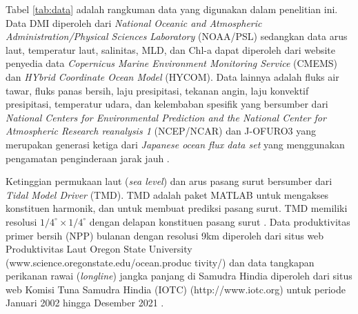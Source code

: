 \begin{spacing}{1.5}
	Tabel \ref*{tab:data} adalah rangkuman data yang digunakan dalam penelitian ini. Data DMI diperoleh dari \textit{National Oceanic and Atmospheric Administration/Physical Sciences Laboratory} (NOAA/PSL) \cite{Saji2003} sedangkan data arus laut, temperatur laut, salinitas, MLD, dan Chl-a dapat diperoleh dari website penyedia data \textit{Copernicus Marine Environment Monitoring Service} (CMEMS)\cite{Lellouche2018} dan \textit{HYbrid Coordinate Ocean Model} (HYCOM)\cite{Chassignet2007}. Data lainnya adalah fluks air tawar, fluks panas bersih, laju presipitasi, tekanan angin, laju konvektif presipitasi, temperatur udara, dan kelembaban spesifik yang bersumber dari \textit{National Centers for Environmental Prediction and the National Center for Atmospheric Research reanalysis 1} (NCEP/NCAR) \cite{Kalnay1996} dan J-OFURO3 yang merupakan generasi ketiga dari \textit{Japanese ocean flux data set} yang menggunakan pengamatan penginderaan jarak jauh \cite{Tomita2019}. 
	
	Ketinggian permukaan laut (\textit{sea level}) dan arus pasang surut bersumber dari \textit{Tidal Model Driver }(TMD). TMD adalah paket MATLAB untuk mengakses konstituen harmonik, dan untuk membuat prediksi pasang surut. TMD memiliki resolusi $1/4^\circ \times 1/4^\circ$ dengan delapan konstituen pasang surut \cite{padman2005tide}. Data produktivitas primer bersih (NPP) bulanan dengan resolusi 9km diperoleh dari situs web Produktivitas Laut Oregon State University (www.science.oregonstate.edu/ocean.produc tivity/) dan data tangkapan perikanan rawai (\textit{longline}) jangka panjang di Samudra Hindia diperoleh dari situs web Komisi Tuna Samudra Hindia (IOTC) (http://www.iotc.org) untuk periode Januari 2002 hingga Desember 2021 \cite{Lan2013}.
	

\end{spacing}

